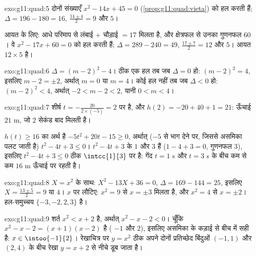 \begin{solution}{exo:g11:quad:5}
दोनों संख्याएँ $x^2 - 14x + 45 = 0$ (\cref{prop:g11:quad:vieta}) को हल करती हैं; $\Delta = 196 - 180 = 16$,  $\frac{14 \pm 4}{2} = 9$ और $5$।

आयत के लिए: आधे परिमाप से लंबाई $+$ चौड़ाई $= 17$ मिलता है, और क्षेत्रफल से
उनका गुणनफल $60$। वे $x^2 - 17x + 60 = 0$ को हल करती हैं; $\Delta = 289 - 240 = 49$,  $\frac{17 \pm 7}{2} = 12$ और $5$। आयत $12 \times 5$
है।
\end{solution}

\begin{solution}{exo:g11:quad:6}
$\Delta = (m-2)^2 - 4$। ठीक एक हल तब जब $\Delta = 0$ हो: $(m-2)^2 = 4$, इसलिए $m - 2 = \pm 2$, अर्थात् $m = 0$ या $m = 4$। कोई
हल नहीं तब जब $\Delta < 0$ हो: $(m-2)^2 < 4$, अर्थात् $-2 < m - 2 < 2$, यानी $0 < m < 4$।
\end{solution}

\begin{solution}{exo:g11:quad:7}
शीर्ष $t = -\frac{20}{2 \times (-5)} = 2$ पर है, और $h(2) = -20 + 40 + 1 = 21$:  ऊँचाई $21$ m, जो $2$ सेकंड बाद मिलती है।

$h(t) \geq 16$ का अर्थ है $-5t^2 + 20t - 15 \geq 0$, अर्थात् ($-5$ से भाग देने पर, जिससे असमिका पलट जाती
है) $t^2 - 4t + 3 \leq 0$। $t^2-4t+3$ के  $1$ और $3$ हैं ($1 - 4 + 3 = 0$, गुणनफल $3$), इसलिए $t^2 - 4t + 3 \leq 0$ ठीक
$\intcc{1}{3}$ पर है: गेंद $t = 1$ s और $t = 3$ s के बीच कम से कम $16$ m ऊँचाई पर रहती है।
\end{solution}

\begin{solution}{exo:g11:quad:8}
$X = x^2$ के साथ: $X^2 - 13X + 36 = 0$, $\Delta = 169 - 144 = 25$, इसलिए $X = \frac{13 \pm 5}{2} = 9$ या $4$। $x$ पर लौटिए: $x^2 = 9$ से
$x = \pm 3$ मिलता है, और $x^2 = 4$ से $x = \pm 2$। हल-समुच्चय $\{-3, -2, 2, 3\}$ है।
\end{solution}

\begin{solution}{exo:g11:quad:9}
शर्त $x^2 < x + 2$ है, अर्थात् $x^2 - x - 2 < 0$। चूँकि $x^2 - x - 2 = (x+1)(x-2)$ है ( $-1$ और $2$), इसलिए
असमिका  के कड़ाई से बीच में सही है: $x \in \intoo{-1}{2}$। रेखाचित्र पर  $y = x^2$ ठीक
अपने दोनों प्रतिच्छेद बिंदुओं $(-1, 1)$ और $(2, 4)$ के बीच रेखा $y = x+2$ से नीचे डूब
जाता है।
\end{solution}

